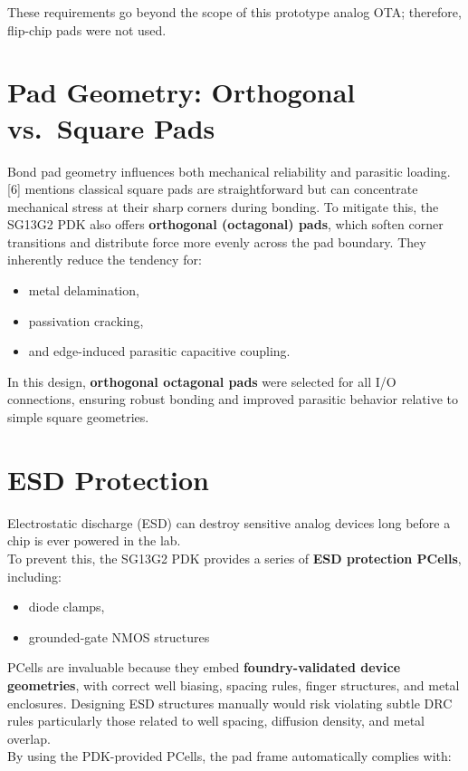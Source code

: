 \documentclass[
  11pt,
  a4paper,
  oneside]{scrbook}
\providecommand{\tightlist}{%
  \setlength{\itemsep}{0pt}\setlength{\parskip}{0pt}}
\begin{document}
These requirements go beyond the scope of this prototype analog OTA;
therefore, flip-chip pads were not used.

\section{Pad Geometry: Orthogonal vs.~Square
Pads}\label{pad-geometry-orthogonal-vs.-square-pads}

Bond pad geometry influences both mechanical reliability and parasitic
loading. {[}6{]} mentions classical square pads are straightforward but
can concentrate mechanical stress at their sharp corners during bonding.
To mitigate this, the SG13G2 PDK also offers \textbf{orthogonal
(octagonal) pads}, which soften corner transitions and distribute force
more evenly across the pad boundary. They inherently reduce the tendency
for:

\begin{itemize}
\tightlist
\item
  metal delamination,\\
\item
  passivation cracking,\\
\item
  and edge-induced parasitic capacitive coupling.
\end{itemize}

In this design, \textbf{orthogonal octagonal pads} were selected for all
I/O connections, ensuring robust bonding and improved parasitic behavior
relative to simple square geometries.

\section{ESD Protection}\label{esd-protection}

Electrostatic discharge (ESD) can destroy sensitive analog devices long
before a chip is ever powered in the lab.\\
To prevent this, the SG13G2 PDK provides a series of \textbf{ESD
protection PCells}, including:

\begin{itemize}
\tightlist
\item
  diode clamps,\\
\item
  grounded-gate NMOS structures
\end{itemize}

PCells are invaluable because they embed \textbf{foundry-validated
device geometries}, with correct well biasing, spacing rules, finger
structures, and metal enclosures. Designing ESD structures manually
would risk violating subtle DRC rules particularly those related to well
spacing, diffusion density, and metal overlap.\\
By using the PDK-provided PCells, the pad frame automatically complies
with:
\end{document}
